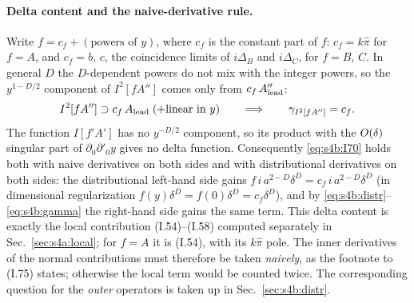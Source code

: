\documentclass[aps,prd,onecolumn,10pt,nofootinbib,floatfix]{revtex4-2}
\newcommand{\eqI}[1]{(I.#1)}
\newcommand{\pihat}{\hat\pi}
\begin{document}
\paragraph*{Delta content and the naive-derivative rule.}
Write $f=c_f+(\text{powers of }y)$, where $c_f$ is the constant part of $f$: $c_f=k\pihat$ for $f=A$, and
$c_f=b,\,c$, the coincidence limits of $i\Delta_B$ and $i\Delta_C$, for $f=B,\,C$. In general $D$ the $D$-dependent
powers do not mix with the integer powers, so the $y^{1-D/2}$ component of $I^2[fA'']$ comes only from
$c_f\,A_{\rm lead}''$:
\begin{equation}
I^2[fA'']\supset c_f\,A_{\rm lead}\;(+\text{linear in }y)\qquad\Longrightarrow\qquad\gamma_{I^2[fA'']}=c_f .
\label{eq:s4b:gamma}
\end{equation}
The function $I[f'A']$ has no $y^{-D/2}$ component, so its product with the $O(\delta)$ singular part of
$\partial_0\partial'_0y$ gives no delta function. Consequently \eqref{eq:s4b:I70} holds both with naive derivatives on
both sides and with distributional derivatives on both sides: the distributional left-hand side gains
$f\,i\,a^{2-D}\delta^D=c_f\,i\,a^{2-D}\delta^D$ (in dimensional regularization $f(y)\delta^D=f(0)\delta^D=c_f\delta^D$), and
by \eqref{eq:s4b:distr}--\eqref{eq:s4b:gamma} the right-hand side gains the same term. This delta content is exactly the local contribution \eqI{54}--\eqI{58} computed
separately in Sec.~\ref{sec:s4a:local}; for $f=A$ it is \eqI{54}, with its $k\pihat$ pole. The inner derivatives of
the normal contributions must therefore be taken \emph{naively}, as the footnote to \eqI{75} states; otherwise the
local term would be counted twice. The corresponding question for the \emph{outer} operators is taken up in
Sec.~\ref{sec:s4b:distr}.
\end{document}
